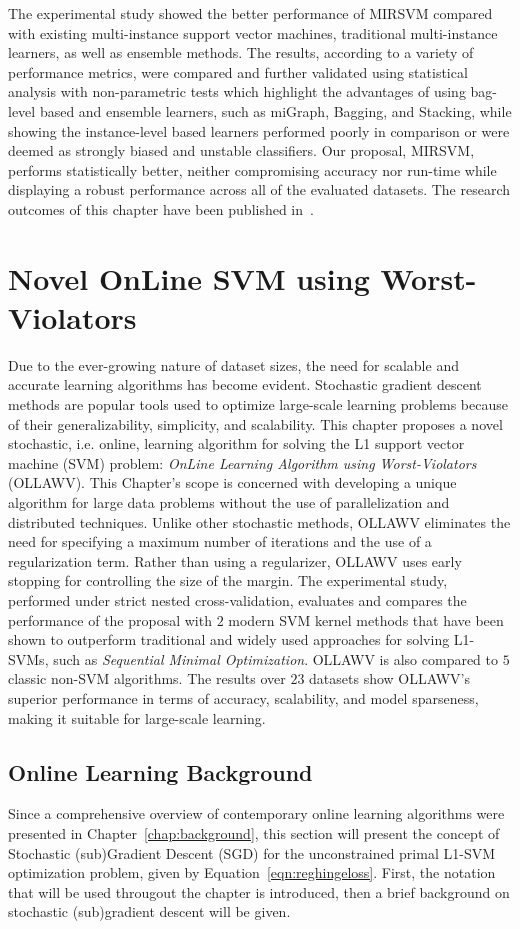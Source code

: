 \documentclass[reqno]{vcuthesis}
\numberwithin{equation}{chapter}
\begin{document}
The experimental study showed the better performance of MIRSVM compared with existing multi-instance support vector machines, traditional multi-instance learners, as well as ensemble methods. The results, according to a variety of performance metrics, were compared and further validated using statistical analysis with non-parametric tests which highlight the advantages of using bag-level based and ensemble learners, such as miGraph, Bagging, and Stacking, while showing the instance-level based learners performed poorly in comparison or were deemed as strongly biased and unstable classifiers. Our proposal, MIRSVM, performs statistically better, neither compromising accuracy nor run-time while displaying a robust performance across all of the evaluated datasets. The research outcomes of this chapter have been published in~\cite{melki2018mirsvm}.

\chapter{Novel OnLine SVM using Worst-Violators}\label{chap:ollawv}
Due to the ever-growing nature of dataset sizes, the need for scalable and accurate learning algorithms has become evident. Stochastic gradient descent methods are popular tools used to optimize large-scale learning problems because of their generalizability, simplicity, and scalability. This chapter proposes a novel stochastic, i.e. online, learning algorithm for solving the L1 support vector machine (SVM) problem: \textit{OnLine Learning Algorithm using Worst-Violators} (OLLAWV). This Chapter's scope is concerned with developing a unique algorithm for large data problems without the use of parallelization and distributed techniques. Unlike other stochastic methods, OLLAWV eliminates the need for specifying a maximum number of iterations and the use of a regularization term. Rather than using a regularizer, OLLAWV uses early stopping for controlling the size of the margin. The experimental study, performed under strict nested cross-validation, evaluates and compares the performance of the proposal with $2$ modern SVM kernel methods that have been shown to outperform traditional and widely used approaches for solving L1-SVMs, such as \textit{Sequential Minimal Optimization}. OLLAWV is also compared to $5$ classic non-SVM algorithms. The results over $23$ datasets show OLLAWV's superior performance in terms of accuracy, scalability, and model sparseness, making it suitable for large-scale learning.

\section{Online Learning Background}
Since a comprehensive overview of contemporary online learning algorithms were presented in Chapter~\ref{chap:background}, this section will present the concept of Stochastic (sub)Gradient Descent (SGD) for the unconstrained primal L1-SVM optimization problem, given by Equation~\ref{eqn:reghingeloss}. First, the notation that will be used througout the chapter is introduced, then a brief background on stochastic (sub)gradient descent will be given.
\end{document}
